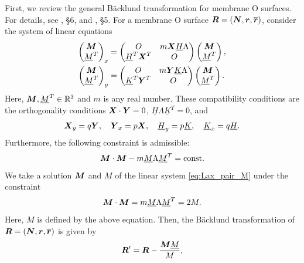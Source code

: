 \documentclass[a4paper]{amsart}
\def\br{\mbox{\boldmath $r$}}
\def\bH{\underline{H}}
\def\bK{\underline{K}}
\def\bM{\mbox{\boldmath $M$}}
\def\uM{\underline{M}}
\def\bN{\mbox{\boldmath $N$}}
\def\R{\mathbb{R}}
\def\bR{\mbox{\boldmath $R$}}
\def\bX{\mbox{\boldmath $X$}}
\def\bY{\mbox{\boldmath $Y$}}
\theoremstyle{definition}
\begin{document}
First, we review the general B\"acklund transformation for membrane O surfaces.
For details, see \cite{RogersSchief}, \S 6, and \cite{schief_unification_2003}, \S 5.
For a membrane O surface $\bR = (\bN, \br, \overline{\br})$, consider the system of linear equations
\begin{equation}
\label{eq:Lax_pair_M}
\begin{aligned}
\begin{pmatrix}
\bM\\
\uM^T
\end{pmatrix}_x &=
\begin{pmatrix}
O & m \bX \bH \Lambda\\
\bH^T \bX^T & O
\end{pmatrix}
\begin{pmatrix}
\bM\\
\uM^T
\end{pmatrix}, \\
\begin{pmatrix}
\bM\\
\uM^T
\end{pmatrix}_y &=
\begin{pmatrix}
O & m \bY \bK \Lambda\\
\bK^T \bY^T & O
\end{pmatrix}
\begin{pmatrix}
\bM\\
\uM^T
\end{pmatrix}.
\end{aligned}
\end{equation}
Here, $\bM, \uM^T \in \R^3$ and $m$ is any real number.
These compatibility conditions are the orthogonality conditions $\bX \cdot \bY = 0$, $\bH \Lambda \bK^T = 0$, and
\begin{equation}
\bX_y = q \bY, \quad
\bY_x = p \bX, \quad
\bH_y = p \bK, \quad
\bK_x = q \bH.
\end{equation}
Furthermore, the following constraint is admissible:
\begin{equation}
\bM \cdot \bM - m \uM \Lambda \uM^T = \textrm{const.}
\end{equation}
We take a solution $\bM$ and $\uM$ of the linear system \eqref{eq:Lax_pair_M} under the constraint
\begin{equation}
\label{eq:constraint_M}
\bM \cdot \bM = m \uM \Lambda \uM^T = 2M.
\end{equation}
Here, $M$ is defined by the above equation.
Then, the B\"acklund transformation of $\bR = (\bN, \br, \overline{\br})$ is given by
\begin{equation}
\bR' 
= \bR - \frac{\bM \uM}{M},
\end{equation}
\end{document}

